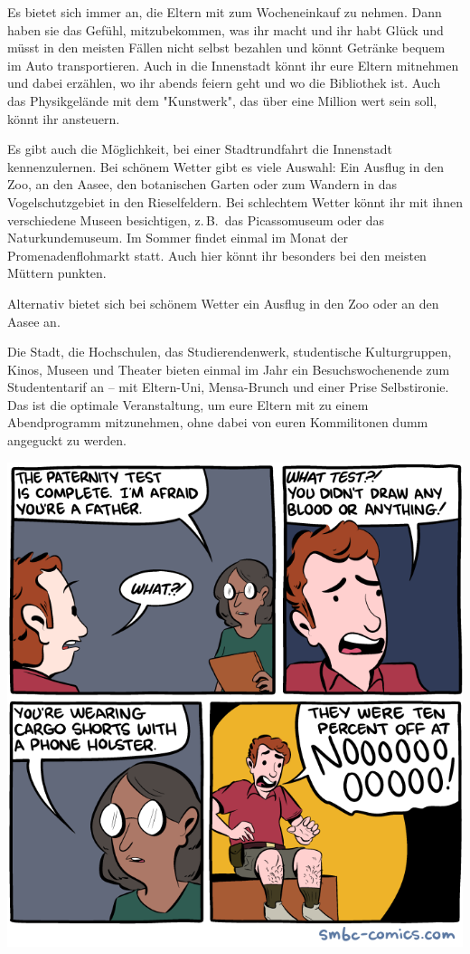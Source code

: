 \begin{multicols}{2}
Es bietet sich immer an, die Eltern mit zum Wocheneinkauf zu nehmen.
Dann haben sie das Gefühl, mitzubekommen, was ihr macht und ihr habt Glück und müsst in den meisten Fällen nicht selbst bezahlen und könnt Getränke bequem im Auto transportieren.
Auch in die Innenstadt könnt ihr eure Eltern mitnehmen und dabei erzählen, wo ihr abends feiern geht und wo die Bibliothek ist.
Auch das Physikgelände mit dem "Kunstwerk", das über eine Million wert sein soll, könnt ihr ansteuern.

Es gibt auch die Möglichkeit, bei einer Stadtrundfahrt die Innenstadt kennenzulernen.
Bei schönem Wetter gibt es viele Auswahl: Ein Ausflug in den Zoo, an den Aasee, den botanischen Garten oder zum Wandern in das Vogelschutzgebiet in den Rieselfeldern.
Bei schlechtem Wetter könnt ihr mit ihnen verschiedene Museen besichtigen, z.\,B.\ das Picassomuseum oder das Naturkundemuseum.
Im Sommer findet einmal im Monat der Promenadenflohmarkt statt.
Auch hier könnt ihr besonders bei den meisten Müttern punkten.

Alternativ bietet sich bei schönem Wetter ein Ausflug in den Zoo oder an den Aasee an.

Die Stadt, die Hochschulen, das Studierendenwerk, studentische Kulturgruppen, Kinos, Museen und Theater bieten einmal im Jahr ein Besuchswochenende zum Studententarif an – mit Eltern-Uni, Mensa-Brunch und einer Prise Selbstironie.
Das ist die optimale Veranstaltung, um eure Eltern mit zu einem Abendprogramm mitzunehmen, ohne dabei von euren Kommilitonen dumm angeguckt zu werden.

\begin{center}
	\includegraphics[width=\columnwidth, height=0.28\textheight]{res/smbc/2016-05-15_paternity-test.png}
\end{center}


\end{multicols}

